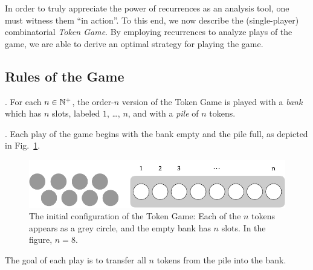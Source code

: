 In order to truly appreciate the power of recurrences as an analysis
tool, one must witness them ``in action''.  To this end, we now
describe the (single-player) combinatorial {\it Token Game}.  By
employing recurrences to analyze plays of the game, we are able to
derive an optimal strategy for playing the game.

\subsection{Rules of the Game}
\label{sec:TokenGame-Rules}

.
For each $n \in \mathbb{N}^+$, the order-$n$ version of the Token Game is
played with a {\it bank} which has $n$ slots, labeled $1$, \ldots,
$n$, and with a {\it pile} of $n$ tokens.

\medskip

.
Each play of the game begins with the bank empty and the pile full, as
depicted in Fig.~\ref{fig:jeujetonsInit}.
\begin{figure}[htb]
\begin{center}
        \includegraphics[scale=0.35]{FiguresMaths/GameTokenInit.png}
\caption{The initial configuration of the Token Game: Each of the $n$
  tokens appears as a grey circle, and the empty bank has $n$ slots.
  In the figure, $n=8$.}
        \label{fig:jeujetonsInit}
\end{center}
\end{figure}
The goal of each play is to transfer all $n$ tokens from the pile into
the bank.

\medskip

